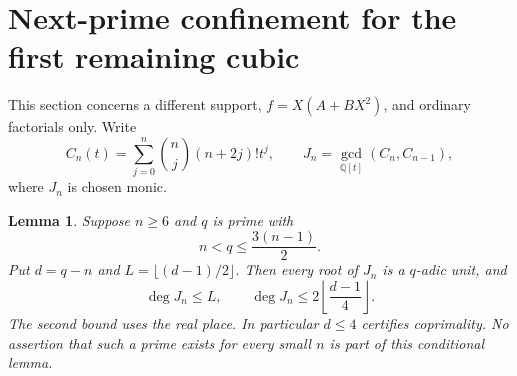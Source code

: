\documentclass[11pt]{article}
\newtheorem{lemma}[theorem]{Lemma}
\begin{document}
\section{Next-prime confinement for the first remaining cubic}
This section concerns a different support, $f=X(A+BX^2)$, and ordinary
factorials only. Write
\[
 C_n(t)=\sum_{j=0}^n\binom nj(n+2j)!t^j,
 \qquad J_n=\gcd_{\mathbb Q[t]}(C_n,C_{n-1}),
\]
where $J_n$ is chosen monic.
\begin{lemma}\label{lem:gap}
Suppose $n\ge6$ and $q$ is prime with
\[
                     n<q\le\frac{3(n-1)}2.                \tag{14}
\]
Put $d=q-n$ and $L=\lfloor(d-1)/2\rfloor$. Then every root of $J_n$
is a $q$-adic unit, and
\[
             \deg J_n\le L,\qquad
             \deg J_n\le2\left\lfloor\frac{d-1}{4}\right\rfloor. \tag{15}
\]
The second bound uses the real place. In particular $d\le4$ certifies
coprimality. No assertion that such a prime exists for every small $n$
is part of this conditional lemma.
\end{lemma}
\end{document}
